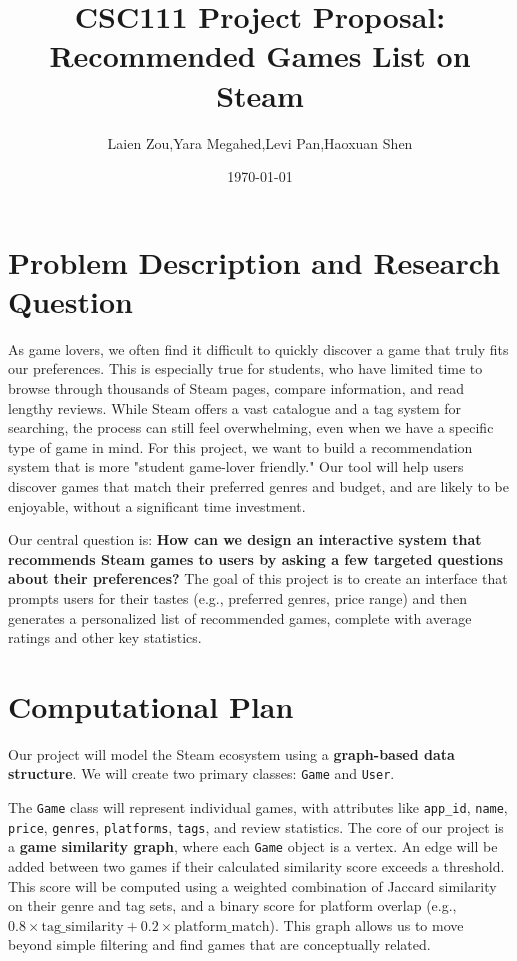 \documentclass[fontsize=11pt]{article}
\title{CSC111 Project Proposal: Recommended Games List on Steam}
\author{Laien Zou,Yara Megahed,Levi Pan,Haoxuan Shen}
\date{\today}
\begin{document}
\maketitle

\section*{Problem Description and Research Question}

As game lovers, we often find it difficult to quickly discover a game that truly fits our preferences. This is especially true for students, who have limited time to browse through thousands of Steam pages, compare information, and read lengthy reviews. While Steam offers a vast catalogue and a tag system for searching, the process can still feel overwhelming, even when we have a specific type of game in mind. For this project, we want to build a recommendation system that is more "student game-lover friendly." Our tool will help users discover games that match their preferred genres and budget, and are likely to be enjoyable, without a significant time investment.

Our central question is: \textbf{How can we design an interactive system that recommends Steam games to users by asking a few targeted questions about their preferences?} The goal of this project is to create an interface that prompts users for their tastes (e.g., preferred genres, price range) and then generates a personalized list of recommended games, complete with average ratings and other key statistics.

\section*{Computational Plan}
Our project will model the Steam ecosystem using a \textbf{graph-based data structure}. We will create two primary classes: \texttt{Game} and \texttt{User}.

The \texttt{Game} class will represent individual games, with attributes like \texttt{app\_id}, \texttt{name}, \texttt{price}, \texttt{genres}, \texttt{platforms}, \texttt{tags}, and review statistics. The core of our project is a \textbf{game similarity graph}, where each \texttt{Game} object is a vertex. An edge will be added between two games if their calculated similarity score exceeds a threshold. This score will be computed using a weighted combination of Jaccard similarity on their genre and tag sets, and a binary score for platform overlap (e.g., \(0.8 \times \text{tag\_similarity} + 0.2 \times \text{platform\_match}\)). This graph allows us to move beyond simple filtering and find games that are conceptually related.
\end{document}
